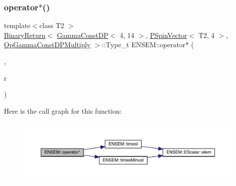 \subsubsection{\texorpdfstring{operator$\ast$()}{operator*()}\hspace{0.1cm}{\footnotesize\ttfamily [31/32]}}
{\footnotesize\ttfamily template$<$class T2 $>$ \\
\mbox{\hyperlink{structENSEM_1_1BinaryReturn}{Binary\+Return}}$<$ \mbox{\hyperlink{classENSEM_1_1GammaConstDP}{Gamma\+Const\+DP}}$<$ 4, 14 $>$, \mbox{\hyperlink{classENSEM_1_1PSpinVector}{P\+Spin\+Vector}}$<$ T2, 4 $>$, \mbox{\hyperlink{structENSEM_1_1OpGammaConstDPMultiply}{Op\+Gamma\+Const\+D\+P\+Multiply}} $>$\+::Type\+\_\+t E\+N\+S\+E\+M\+::operator$\ast$ (\begin{DoxyParamCaption}\item[{const \mbox{\hyperlink{classENSEM_1_1GammaConstDP}{Gamma\+Const\+DP}}$<$ 4, 14 $>$ \&}]{,  }\item[{const \mbox{\hyperlink{classENSEM_1_1PSpinVector}{P\+Spin\+Vector}}$<$ T2, 4 $>$ \&}]{r }\end{DoxyParamCaption})\hspace{0.3cm}{\ttfamily [inline]}}

Here is the call graph for this function\+:\nopagebreak
\begin{figure}[H]
\begin{center}
\leavevmode
\includegraphics[width=350pt]{dd/d6d/group__primspinvector_gad8abbefefdc24a79b3e5e3a161441643_cgraph}
\end{center}
\end{figure}
\mbox{\label{group__primspinvector_ga23212ad644650a519a334e7eb30cb99a}} 
